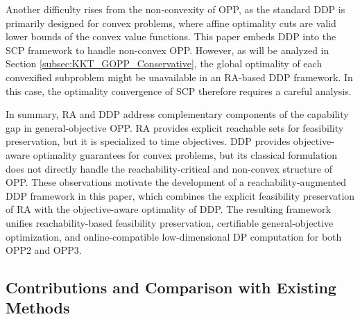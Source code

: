 \documentclass[journal]{IEEEtran}
\theoremstyle{definition}
\theoremstyle{definition}
\begin{document}
Another difficulty rises from the non-convexity of OPP, as the standard DDP is primarily designed for convex problems, where affine optimality cuts are valid lower bounds of the convex value functions. This paper embeds DDP into the SCP framework to handle non-convex OPP. However, as will be analyzed in Section \ref{subsec:KKT_GOPP_Conservative}, the global optimality of each convexified subproblem might be unavailable in an RA-based DDP framework. In this case, the optimality convergence of SCP therefore requires a careful analysis.

In summary, RA and DDP address complementary components of the capability gap in general-objective OPP. RA provides explicit reachable sets for feasibility preservation, but it is specialized to time objectives. DDP provides objective-aware optimality guarantees for convex problems, but its classical formulation does not directly handle the reachability-critical and non-convex structure of OPP. These observations motivate the development of a reachability-augmented DDP framework in this paper, which combines the explicit feasibility preservation of RA with the objective-aware optimality of DDP. The resulting framework unifies reachability-based feasibility preservation, certifiable general-objective optimization, and online-compatible low-dimensional DP computation for both OPP2 and OPP3.

\subsection{Contributions and Comparison with Existing Methods}
\end{document}
